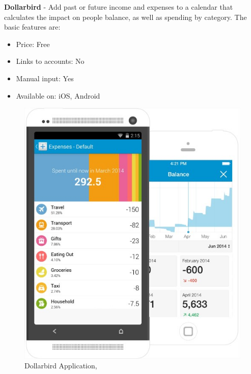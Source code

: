 \textbf{Dollarbird} - Add past or future income and expenses to a calendar that calculates the impact on people balance, as well as spending by category. The basic features are:
\begin{itemize}
	\item Price: Free
	\item Links to accounts: No
	\item Manual input: Yes
	\item Available on: iOS, Android
\end{itemize}
\begin{figure}[H]
	\centering
	\includegraphics[width=12cm]{Chapter1/Dollarbird.jpg}
	\caption{Dollarbird Application, \cite{Dollarbird}}
	\label{fig:Dollarbird}
\end{figure}

